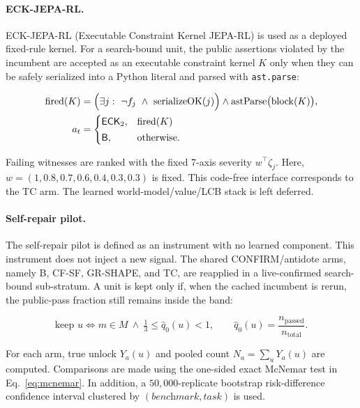\documentclass{article}
\numberwithin{equation}{section}  %
\theoremstyle{definition}
\newcommand{\armB}{\textsf{B}}
\newcommand{\armTC}{\textsf{TC}}
\newcommand{\armCF}{\textsf{CF-SF}}
\newcommand{\armGR}{\textsf{GR-SHAPE}}
\begin{document}
\paragraph{ECK-JEPA-RL.}
ECK-JEPA-RL (Executable Constraint Kernel JEPA-RL) is used as a deployed fixed-rule kernel.
For a search-bound unit, the public assertions violated by the incumbent are accepted as an
executable constraint kernel $K$ only when they can be safely serialized into a Python
literal and parsed with \texttt{ast.parse}:

\begin{equation}\label{eq:eck}
\begin{aligned}
\mathrm{fired}(K)&=\Bigl(\exists j:\ \neg f_j\ \wedge\ \mathrm{serializeOK}(j)\Bigr)\wedge
\mathrm{astParse}\bigl(\mathrm{block}(K)\bigr),\\
a_t&=\begin{cases}\textsf{ECK}_2,&\mathrm{fired}(K)\\[2pt] \armB,&\text{otherwise.}\end{cases}
\end{aligned}
\end{equation}

Failing witnesses are ranked with the fixed 7-axis severity $w^\top\zeta_j$. Here,
$w=(1,0.8,0.7,0.6,0.4,0.3,0.3)$ is fixed. This code-free interface corresponds to the
\armTC{} arm. The learned world-model/value/LCB stack is left deferred.

\paragraph{Self-repair pilot.}
The self-repair pilot is defined as an instrument with no learned component. This instrument
does not inject a new signal. The shared CONFIRM/antidote arms, namely \armB{}, \armCF{},
\armGR{}, and \armTC{}, are reapplied in a live-confirmed search-bound sub-stratum. A unit is
kept only if, when the cached incumbent is rerun, the public-pass fraction still remains
inside the band:

\begin{equation}\label{eq:sr}
\text{keep } u \iff m\in M\ \wedge\ \tfrac{1}{3}\le \hat q_0(u)<1,
\qquad \hat q_0(u)=\frac{n_{\mathrm{passed}}}{n_{\mathrm{total}}} .
\end{equation}

For each arm, true unlock $Y_a(u)$ and pooled count $N_a=\sum_u Y_a(u)$ are computed.
Comparisons are made using the one-sided exact McNemar test in Eq.~\eqref{eq:mcnemar}.
In addition, a $50{,}000$-replicate bootstrap risk-difference confidence interval clustered
by $(\textit{benchmark},\textit{task})$ is used.
\end{document}
